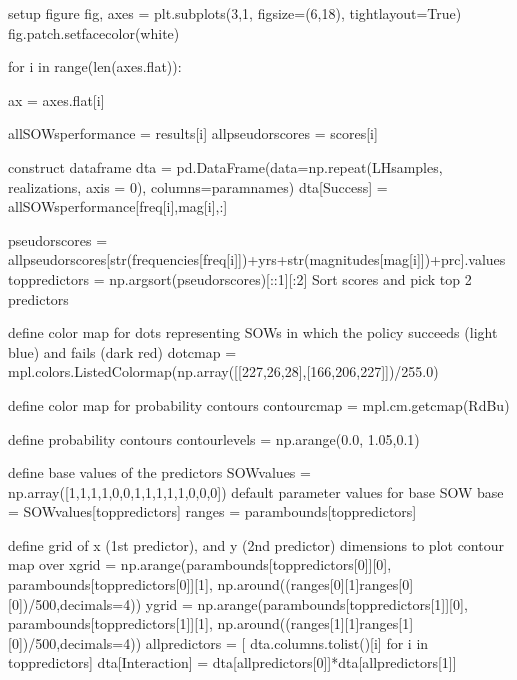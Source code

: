 \documentclass[letterpaper,10pt,english]{book}
\begin{document}
\begin{sphinxVerbatim}[commandchars=\\\{\}]
\PYGZsh{} setup figure
fig, axes = plt.subplots(3,1, figsize=(6,18), tight\PYGZus{}layout=True)
fig.patch.set\PYGZus{}facecolor(\PYGZsq{}white\PYGZsq{})

for i in range(len(axes.flat)):

    ax = axes.flat[i]

    allSOWsperformance = results[i]
    all\PYGZus{}pseudo\PYGZus{}r\PYGZus{}scores = scores[i]

    \PYGZsh{} construct dataframe
    dta = pd.DataFrame(data=np.repeat(LHsamples, realizations, axis = 0), columns=param\PYGZus{}names)
    dta[\PYGZsq{}Success\PYGZsq{}] = allSOWsperformance[freq[i],mag[i],:]

    pseudo\PYGZus{}r\PYGZus{}scores = all\PYGZus{}pseudo\PYGZus{}r\PYGZus{}scores[str(frequencies[freq[i]])+\PYGZsq{}yrs\PYGZus{}\PYGZsq{}+str(magnitudes[mag[i]])+\PYGZsq{}prc\PYGZsq{}].values
    top\PYGZus{}predictors = np.argsort(pseudo\PYGZus{}r\PYGZus{}scores)[::\PYGZhy{}1][:2] \PYGZsh{}Sort scores and pick top 2 predictors

    \PYGZsh{} define color map for dots representing SOWs in which the policy
    \PYGZsh{} succeeds (light blue) and fails (dark red)
    dot\PYGZus{}cmap = mpl.colors.ListedColormap(np.array([[227,26,28],[166,206,227]])/255.0)

    \PYGZsh{} define color map for probability contours
    contour\PYGZus{}cmap = mpl.cm.get\PYGZus{}cmap(\PYGZsq{}RdBu\PYGZsq{})

    \PYGZsh{} define probability contours
    contour\PYGZus{}levels = np.arange(0.0, 1.05,0.1)

    \PYGZsh{} define base values of the predictors
    SOW\PYGZus{}values = np.array([1,1,1,1,0,0,1,1,1,1,1,0,0,0]) \PYGZsh{} default parameter values for base SOW
    base = SOW\PYGZus{}values[top\PYGZus{}predictors]
    ranges = param\PYGZus{}bounds[top\PYGZus{}predictors]

    \PYGZsh{} define grid of x (1st predictor), and y (2nd predictor) dimensions
    \PYGZsh{} to plot contour map over
    xgrid = np.arange(param\PYGZus{}bounds[top\PYGZus{}predictors[0]][0],
                      param\PYGZus{}bounds[top\PYGZus{}predictors[0]][1], np.around((ranges[0][1]\PYGZhy{}ranges[0][0])/500,decimals=4))
    ygrid = np.arange(param\PYGZus{}bounds[top\PYGZus{}predictors[1]][0],
                      param\PYGZus{}bounds[top\PYGZus{}predictors[1]][1], np.around((ranges[1][1]\PYGZhy{}ranges[1][0])/500,decimals=4))
    all\PYGZus{}predictors = [ dta.columns.tolist()[i] for i in top\PYGZus{}predictors]
    dta[\PYGZsq{}Interaction\PYGZsq{}] = dta[all\PYGZus{}predictors[0]]*dta[all\PYGZus{}predictors[1]]


\end{sphinxVerbatim}
\end{document}
